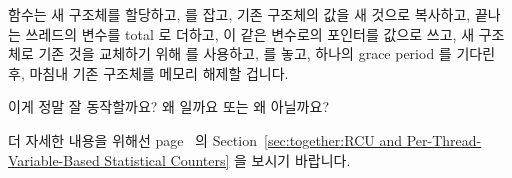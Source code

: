 {	\fi

	 함수는 새 구조체를 할당하고,
	 를 잡고, 기존 구조체의 값을 새 것으로 복사하고, 끝나는
	쓰레드의  변수를 total 로 더하고, 이 같은 
	변수로의 포인터를  값으로 쓰고, 새 구조체로 기존 것을 교체하기
	위해  를 사용하고,  를 놓고,
	하나의 grace period 를 기다린 후, 마침내 기존 구조체를 메모리 해제할
	겁니다.

	이게 정말 잘 동작할까요?
	왜 일까요 또는 왜 아닐까요?

	더 자세한 내용을 위해선
	page~\pageref{sec:together:RCU and Per-Thread-Variable-Based Statistical Counters}
	의
	Section~\ref{sec:together:RCU and Per-Thread-Variable-Based Statistical Counters}
	을 보시기 바랍니다.

	\iffalse

	The \co{count_unregister_thread()} function would need to
	allocate a new structure, acquire \co{final_mutex},
	copy the old structure to the new one, add the outgoing
	thread's \co{counter} variable to the total, \co{NULL}
	the pointer to this same \co{counter} variable,
	use \co{rcu_assign_pointer()} to install the new structure
	in place of the old one, release \co{final_mutex},
	wait for a grace period, and finally free the old structure.

	Does this really work?
	Why or why not?

	See
	Section~\ref{sec:together:RCU and Per-Thread-Variable-Based Statistical Counters}
	on
	page~\pageref{sec:together:RCU and Per-Thread-Variable-Based Statistical Counters}
	for more details.

	\fi

}\EQuickQuizEnd

